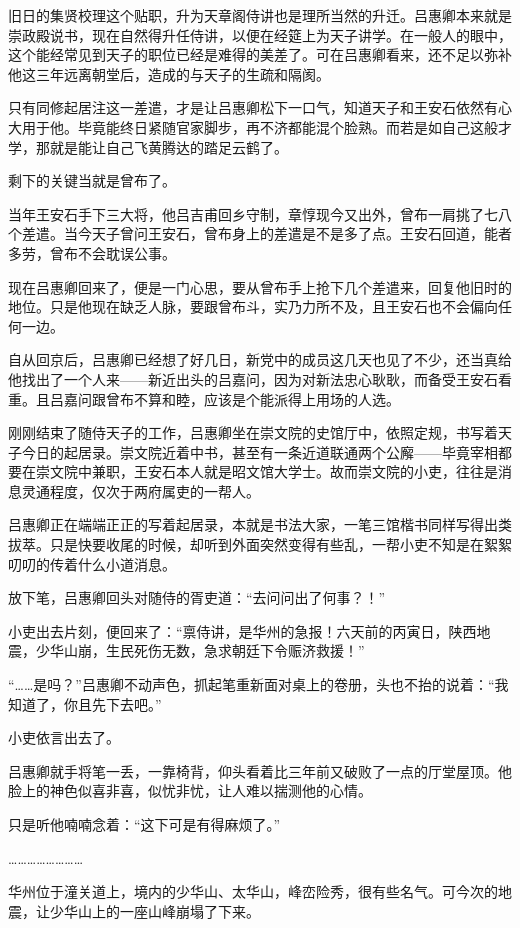 旧日的集贤校理这个贴职，升为天章阁侍讲也是理所当然的升迁。吕惠卿本来就是崇政殿说书，现在自然得升任侍讲，以便在经筵上为天子讲学。在一般人的眼中，这个能经常见到天子的职位已经是难得的美差了。可在吕惠卿看来，还不足以弥补他这三年远离朝堂后，造成的与天子的生疏和隔阂。

只有同修起居注这一差遣，才是让吕惠卿松下一口气，知道天子和王安石依然有心大用于他。毕竟能终日紧随官家脚步，再不济都能混个脸熟。而若是如自己这般才学，那就是能让自己飞黄腾达的踏足云鹤了。

剩下的关键当就是曾布了。

当年王安石手下三大将，他吕吉甫回乡守制，章惇现今又出外，曾布一肩挑了七八个差遣。当今天子曾问王安石，曾布身上的差遣是不是多了点。王安石回道，能者多劳，曾布不会耽误公事。

现在吕惠卿回来了，便是一门心思，要从曾布手上抢下几个差遣来，回复他旧时的地位。只是他现在缺乏人脉，要跟曾布斗，实乃力所不及，且王安石也不会偏向任何一边。

自从回京后，吕惠卿已经想了好几日，新党中的成员这几天也见了不少，还当真给他找出了一个人来——新近出头的吕嘉问，因为对新法忠心耿耿，而备受王安石看重。且吕嘉问跟曾布不算和睦，应该是个能派得上用场的人选。

刚刚结束了随侍天子的工作，吕惠卿坐在崇文院的史馆厅中，依照定规，书写着天子今日的起居录。崇文院近着中书，甚至有一条近道联通两个公廨——毕竟宰相都要在崇文院中兼职，王安石本人就是昭文馆大学士。故而崇文院的小吏，往往是消息灵通程度，仅次于两府属吏的一帮人。

吕惠卿正在端端正正的写着起居录，本就是书法大家，一笔三馆楷书同样写得出类拔萃。只是快要收尾的时候，却听到外面突然变得有些乱，一帮小吏不知是在絮絮叨叨的传着什么小道消息。

放下笔，吕惠卿回头对随侍的胥吏道：“去问问出了何事？！”

小吏出去片刻，便回来了：“禀侍讲，是华州的急报！六天前的丙寅日，陕西地震，少华山崩，生民死伤无数，急求朝廷下令赈济救援！”

“……是吗？”吕惠卿不动声色，抓起笔重新面对桌上的卷册，头也不抬的说着：“我知道了，你且先下去吧。”

小吏依言出去了。

吕惠卿就手将笔一丢，一靠椅背，仰头看着比三年前又破败了一点的厅堂屋顶。他脸上的神色似喜非喜，似忧非忧，让人难以揣测他的心情。

只是听他喃喃念着：“这下可是有得麻烦了。”

……………………

华州位于潼关道上，境内的少华山、太华山，峰峦险秀，很有些名气。可今次的地震，让少华山上的一座山峰崩塌了下来。

